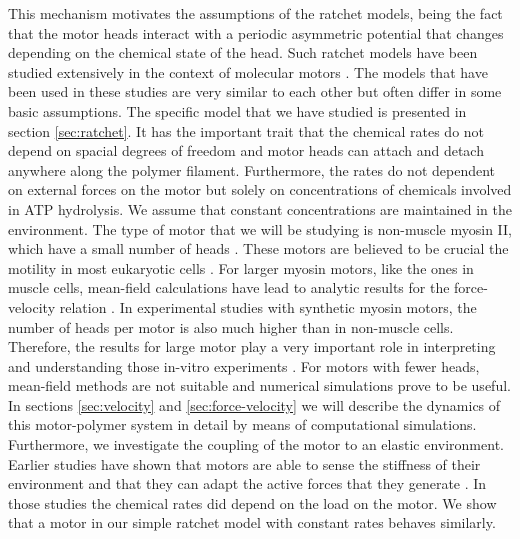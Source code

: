 \documentclass[aps,pre,twocolumn,showpacs,showkeys,superscriptaddress,floatfix]{revtex4-1}
\begin{document}
This mechanism motivates the assumptions of the ratchet models, being the fact that the motor heads interact with a periodic asymmetric potential that changes depending on the chemical state of the head. 
Such ratchet models have been studied extensively in the context of molecular motors \cite{reimann2002brownian,astumian1994fluctuation,astumian1996mechanochemical,julicher1997modeling,Reimann2002introduction,julicher1997spontaneous,peskin1995correlation,huxley1969mechanism,huxley1971proposed}.
The models that have been used in these studies are very similar to each other but often differ in some basic assumptions.
The specific model that we have studied is presented in section \ref{sec:ratchet}. 
It has the important trait that the chemical rates do not depend on spacial degrees of freedom and motor heads can attach and detach anywhere along the polymer filament.
Furthermore, the rates do not dependent on external forces on the motor but solely on concentrations of chemicals involved in ATP hydrolysis. We assume that constant concentrations are maintained in the environment. 
The type of motor that we will be studying is non-muscle myosin II, which have a small number of heads \cite{pollard1982structure}. 
These motors are believed to be crucial the motility in most eukaryotic cells \cite{vicente2009non}.
For larger myosin motors, like the ones in muscle cells, mean-field calculations have lead to analytic results for the force-velocity relation \cite{julicher1997modeling}.
In experimental studies with synthetic myosin motors, the number of heads per motor is also much higher than in non-muscle cells. 
Therefore, the results for large motor play a very important role in interpreting and understanding those in-vitro experiments \cite{brown2009cross-correlated}.
For motors with fewer heads, mean-field methods are not suitable and numerical simulations prove to be useful.
In sections \ref{sec:velocity} and \ref{sec:force-velocity} we will describe the dynamics of this motor-polymer system in detail by means of computational simulations.
Furthermore, we investigate the coupling of the motor to an elastic environment.
Earlier studies have shown that motors are able to sense the stiffness of their environment and that they can adapt the active forces that they generate \cite{stam2015isoforms,albert2014stochastic}.
In those studies the chemical rates did depend on the load on the motor. 
We show that a motor in our simple ratchet model with constant rates behaves similarly.
\end{document}
